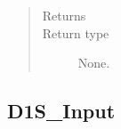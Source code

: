 \documentclass[letterpaper,10pt,english]{sphinxmanual}
\begin{document}
\begin{fulllineitems}
\begin{fulllineitems}
\begin{quote}
\begin{description}
\item[{Returns}] \leavevmode


\item[{Return type}] \leavevmode
None.

\end{description}\end{quote}

\end{fulllineitems}


\end{fulllineitems}



\subsection{D1S\_Input}
\label{\detokenize{api/inputgeneration:d1s-input}}
\end{document}
